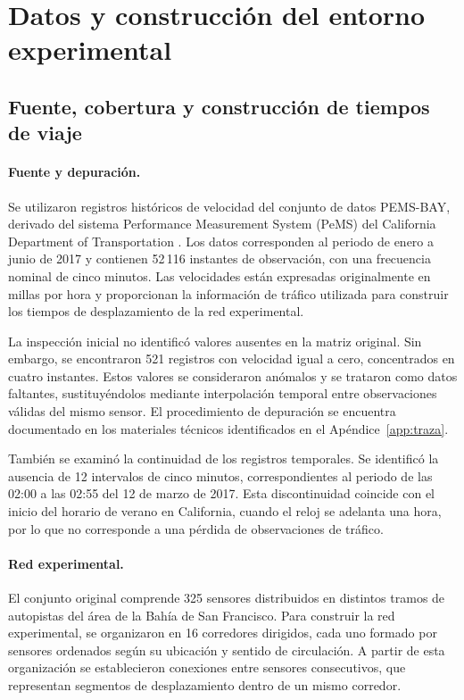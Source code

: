 \documentclass[letterpaper,11pt]{article}
\begin{document}
\section{Datos y construcción del entorno experimental}

\subsection{Fuente, cobertura y construcción de tiempos de viaje}

\paragraph{Fuente y depuración.}
Se utilizaron registros históricos de velocidad del conjunto de datos PEMS-BAY, derivado del sistema Performance Measurement System (PeMS) del California Department of Transportation \parencite{caltrans,li2018}. Los datos corresponden al periodo de enero a junio de 2017 y contienen 52\,116 instantes de observación, con una frecuencia nominal de cinco minutos. Las velocidades están expresadas originalmente en millas por hora y proporcionan la información de tráfico utilizada para construir los tiempos de desplazamiento de la red experimental.

La inspección inicial no identificó valores ausentes en la matriz original. Sin embargo, se encontraron 521 registros con velocidad igual a cero, concentrados en cuatro instantes. Estos valores se consideraron anómalos y se trataron como datos faltantes, sustituyéndolos mediante interpolación temporal entre observaciones válidas del mismo sensor. El procedimiento de depuración se encuentra documentado en los materiales técnicos identificados en el Apéndice~\ref{app:traza}.

También se examinó la continuidad de los registros temporales. Se identificó la ausencia de 12 intervalos de cinco minutos, correspondientes al periodo de las 02:00 a las 02:55 del 12 de marzo de 2017. Esta discontinuidad coincide con el inicio del horario de verano en California, cuando el reloj se adelanta una hora, por lo que no corresponde a una pérdida de observaciones de tráfico.

\paragraph{Red experimental.}
El conjunto original comprende 325 sensores distribuidos en distintos tramos de autopistas del área de la Bahía de San Francisco. Para construir la red experimental, se organizaron en 16 corredores dirigidos, cada uno formado por sensores ordenados según su ubicación y sentido de circulación. A partir de esta organización se establecieron conexiones entre sensores consecutivos, que representan segmentos de desplazamiento dentro de un mismo corredor.
\end{document}
